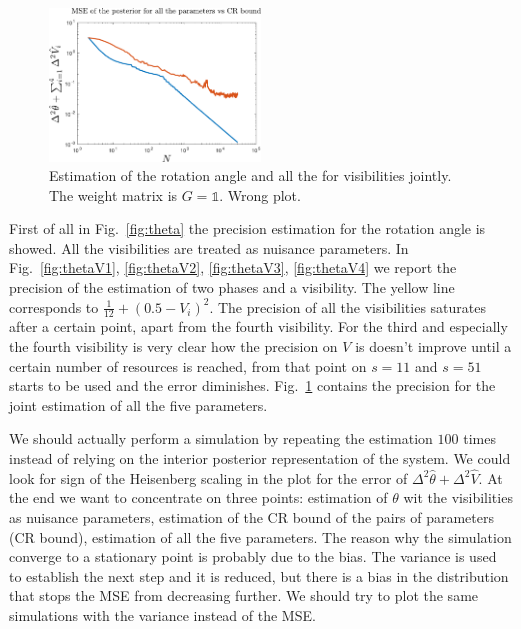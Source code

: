 \documentclass[aps, pra, 10pt, twocolumn, superscriptaddress,floatfix]{revtex4-1}
\def \id {\mathds{1}}
\begin{document}
%
\begin{figure}[!t]
	\begin{center}
		\includegraphics[width=0.5\textwidth]{allParameters.pdf}
	\end{center}
	\caption{Estimation of the rotation angle and all the for visibilities jointly. The weight matrix is $G = \id$.  {\color{red} Wrong plot.}}
	\label{fig:allParameters}
\end{figure}

First of all in Fig.~\ref{fig:theta} the precision estimation for the rotation angle is showed. All the visibilities are treated as nuisance parameters. In Fig.~\ref{fig:thetaV1}, \ref{fig:thetaV2}, \ref{fig:thetaV3}, \ref{fig:thetaV4} we report the precision of the estimation of two phases and a visibility. The yellow line corresponds to $\frac{1}{12} + (0.5 - V_i)^2$. The precision of all the visibilities saturates after a certain point, apart from the fourth visibility. For the third and especially the fourth visibility is very clear how the precision on $V$ is doesn't improve until a certain number of resources is reached, from that point on $s=11$ and $s=51$ starts to be used and the error diminishes. Fig.~\ref{fig:allParameters} contains the precision for the joint estimation of all the five parameters.

{\color{red} We should actually perform a simulation by repeating the estimation $100$ times instead of relying on the interior posterior representation of the system. We could look for sign of the Heisenberg scaling in the plot for the error of $\Delta^2 \hat{\theta} + \Delta^2 \hat{V}$. At the end we want to concentrate on three points: estimation of $\theta$ wit the visibilities as nuisance parameters, estimation of the CR bound of the pairs of parameters (CR bound), estimation of all the five parameters. The reason why the simulation converge to a stationary point is probably due to the bias. The variance is used to establish the next step and it is reduced, but there is a bias in the distribution that stops the MSE from decreasing further. We should try to plot the same simulations with the variance instead of the MSE.}
\end{document}
